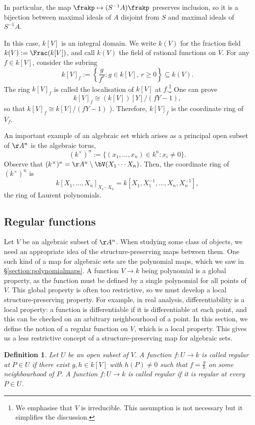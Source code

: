 \documentclass[12pt]{amsart}
\theoremstyle{plain}
\newtheorem{definition}[theorem]{Definition}
\theoremstyle{definition}
\begin{document}
In particular, the map $\frakp \mapsto (S^{-1}A) \frakp$ preserves inclusion, so it is a bijection between maximal ideals of $A$ disjoint from $S$ and maximal ideals of $S^{-1}A$.

In this case, $k[V]$ is an integral domain.
We write $k(V)$ for the fraction field $k(V):=\Frac(k[V])$, and call $k(V)$ the field of rational functions on $V$.
For any $f \in k[V]$, consider the subring
$$k[V]_f := \left\{\frac{g}{f^r} : g \in k[V], \, r \ge 0\right\} \subseteq k(V).$$
The ring $k[V]_f$ is called the localisation of $k[V]$ at $f$.\footnote{We emphasise that $V$ is irreducible. This assumption is not necessary but it simplifies the discussion.}
One can prove 
$$k[V]_f \cong (k[V])[Y] / (f Y -1),$$
so that $k[V]_f \cong k[V]/(fY-1)$ \cite[Lemma 1.13]{Milne13}).
Therefore, $k[V]_f$ is the coordinate ring of $V_f$.

An important example of an algebraic set which arises as a principal open subset of $\AA^n$ is the algebraic torus,
$$(k^\times)^n := \{(x_1, \ldots, x_n) \in k^n : x_i \ne 0\}.$$
Observe that $(k^\times)^n = \AA^n \setminus \bV(X_1 \cdots X_n)$.
Then, the coordinate ring of $(k^\times)^n$ is 
$$k[X_1, \ldots, X_n]_{X_1 \cdots X_n} = k[X_1, X_1^{-1}, \ldots, X_n, X_n^{-1}],$$
the ring of Laurent polynomials.





\subsection{Regular functions}
Let $V$ be an algebraic subset of $\AA^n$.
When studying some class of objects, we need an appropriate idea of the structure-preserving maps between them.
One such kind of a map for algebraic sets are the polynomial maps, which we saw in \S \ref{section:polynomialmaps}.
A function $V \to k$ being polynomial is a global property, as the function must be defined by a single polynomial for all points of $V$.
This global property is often too restrictive, so we must develop a local structure-preserving property.
For example, in real analysis, differentiability is a local property: a function is differentiable if it is differentiable at each point, and this can be checked on an arbitrary neighbourhood of a point.
In this section, we define the notion of a regular function on $V$, which is a local property.
This gives us a less restrictive concept of a structure-preserving map for algebraic sets.

\begin{definition}
Let $U$ be an open subset of $V$.
A function $f : U \to k$ is called regular at $P \in U$ if there exist $g, h \in k[V]$ with $h(P)\ne 0$ such that $f = \frac{g}{h}$ on some neighbourhood of $P$.
A function $f:U\to k$ is called regular if it is regular at every $P \in U$.
\end{definition}
\end{document}
